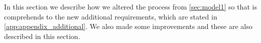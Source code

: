 
In this section we describe how we altered the process from \autoref{sec:model1} so that is comprehends to the new additional requirements, which are stated in \autoref{app:appendix_additional}. We also made some improvements and these are also described in this section.